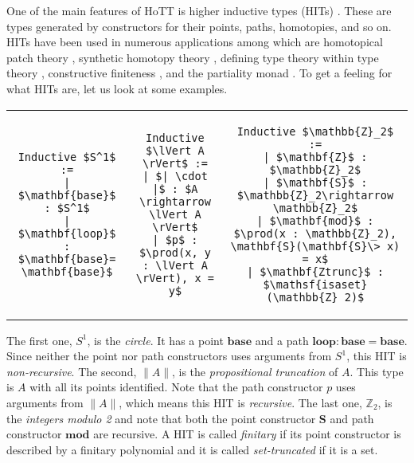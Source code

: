 \documentclass[9pt]{entcs}
\newcommand{\constructor}[1]{\mathbf{#1}}
\newcommand{\function}[1]{\mathsf{#1}}
\newcommand{\deprod}[3]{\prod(#1 : #2), #3} %
\newcommand{\0}{\textbf{0}} %
\newcommand{\isaset}[1]{\function{isaset}(#1)} %
\newcommand{\trunct}[1]{\lVert #1 \rVert} %
\newcommand{\truncel}[1]{| #1 |} %
\newcommand{\Circ}{S^1} %
\newcommand{\base}{\constructor{base}} %
\newcommand{\loopS}{\constructor{loop}} %
\newcommand{\modZ}{\mathbb{Z}_2} %
\newcommand{\ZZ}{\constructor{Z}} %
\newcommand{\SZ}{\constructor{S}} %
\newcommand{\modP}{\constructor{mod}} %
\newcommand{\setZ}{\constructor{Ztrunc}} %
\begin{document}
One of the main features of HoTT is higher inductive types (HITs) \cite{hottbook}.
These are types generated by constructors for their points, paths, homotopies, and so on.
HITs have been used in numerous applications among which are homotopical patch theory \cite{AngiuliMLH16}, synthetic homotopy theory \cite{LicataF14,LicataS13,hottbook}, defining type theory within type theory \cite{AltenkirchK16,DBLP:journals/lmcs/AltenkirchK17}, constructive finiteness \cite{FruminGGW18}, and the partiality monad \cite{AltenkirchDK17}.
To get a feeling for what HITs are, let us look at some examples.

\lstset{language=Coq}
\setlength{\tabcolsep}{30pt}	
\begin{tabular}{ c c c }

\begin{lstlisting}[mathescape=true]
Inductive $\Circ$ :=
| $\base$ : $\Circ$
| $\loopS$ : $\base = \base$
\end{lstlisting}
&
\begin{lstlisting}[mathescape=true]
Inductive $\trunct{A}$ :=
| $\truncel{\cdot}$ : $A \rightarrow \trunct{A}$
| $p$ : $\deprod{x, y}{\trunct{A}}{x = y}$
\end{lstlisting}
&
\begin{lstlisting}[mathescape=true]
Inductive $\modZ$ :=
| $\ZZ$ : $\modZ$
| $\SZ$ : $\modZ \rightarrow \modZ$
| $\modP$ : $\deprod{x}{\modZ}{\SZ(\SZ \> x) = x}$
| $\setZ$ : $\isaset{\modZ}$
\end{lstlisting}
\end{tabular}

The first one, $\Circ$, is the \emph{circle}.
It has a point $\base$ and a path $\loopS : \base = \base$.
Since neither the point nor path constructors uses arguments from $\Circ$, this HIT is \emph{non-recursive}.
The second, $\trunct{A}$, is the \emph{propositional truncation} of $A$.
This type is $A$ with all its points identified.
Note that the path constructor $p$ uses arguments from $\trunct{A}$, which means this HIT is \emph{recursive}.
The last one, $\modZ$, is the \emph{integers modulo 2} and note that both the point constructor $\SZ$ and path constructor $\modP$ are recursive.
A HIT is called \emph{finitary} if its point constructor is described by a finitary polynomial and it is called \emph{set-truncated} if it is a set.
\end{document}
